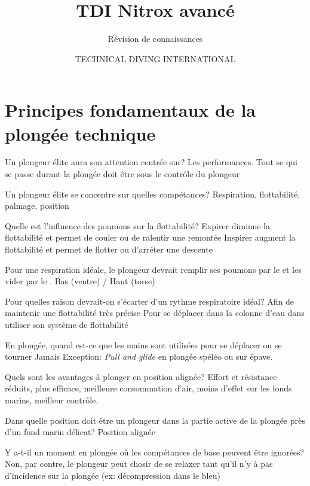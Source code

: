 \documentclass[english,12pt,a4paper]{article}
\title{TDI Nitrox avancé}
\subtitle{Révision de connaissances}
\author{TECHNICAL DIVING INTERNATIONAL}
\begin{document}
	

	\setcounter{section}{1}
	\section{Principes fondamentaux de la plongée technique}

	\begin{outline}[enumerate]
		\1 Un plongeur élite aura son attention centrée sur?
			\2 Les performances.
			\2 Tout se qui se passe durant la plongée doit être sous le contrôle du plongeur
	
		\1 Un plongeur élite se concentre sur quelles compétances?
			\2 Respiration, flottabilité, palmage, position
	
		\1 Quelle est l'influence des poumons sur la flottabilité?
			\2 Expirer diminue la flottabilité et permet de couler ou de ralentir une remontée
			\2 Inspirer augment la flottabilité et permet de flotter ou d'arréter une descente
	
		\1 Pour une respiration idéale, le plongeur devrait remplir ses poumons par le \underline{	\hspace{1.5cm}} et les vider par le \underline{\hspace{1.5cm}}.
			\2 Bas (ventre) / Haut (torse)
	
		\1 Pour quelles raison devrait-on s'écarter d'un rythme respiratoire idéal?
			\2 Afin de maintenir une flottabilité très précise
			\2 Pour se déplacer dans la colonne d'eau dans utiliser son système de flottabilité
	
		\1 En plongée, quand est-ce que les mains sont utilisées pour se déplacer ou se tourner
			\2 Jamais
			\2 Exception: \textit{Pull and glide} en plongée spéléo ou sur épave.
	
		\1 Quels sont les avantages à plonger en position alignée?
			\2 Effort et résistance réduits, plus efficace, meilleure consommation d'air, moins 	d'effet sur les fonds marins, meilleur contrôle.
	
		\1 Dans quelle position doit être un plongeur dans la partie active de la plongée près 	d'un 	fond marin délicat?
			\2 Position alignée
	
		\1 Y a-t-il un moment en plongée où les compétances de base peuvent être ignorées?
			\2 Non, par contre, le plongeur peut chosir de se relaxer tant qu'il n'y à pas 	d'incidence sur la plongée (ex: décompression dans le bleu)
	\end{outline}
	\pagebreak
\end{document}
